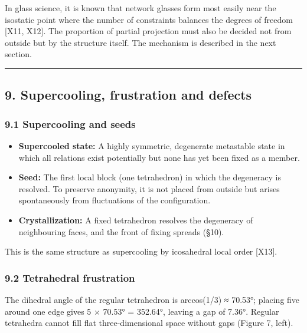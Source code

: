 \documentclass[
  a4paper,
]{article}
\newcounter{none} %
\providecommand{\tightlist}{%
  \setlength{\itemsep}{0pt}\setlength{\parskip}{0pt}}
\begin{document}
In glass science, it is known that network glasses form most easily near
the isostatic point where the number of constraints balances the degrees
of freedom {[}X11, X12{]}. The proportion of partial projection must
also be decided not from outside but by the structure itself. The
mechanism is described in the next section.

\begin{center}\rule{0.5\linewidth}{0.5pt}\end{center}

\subsection{9. Supercooling, frustration and
defects}\label{supercooling-frustration-and-defects}

\subsubsection{9.1 Supercooling and seeds}\label{supercooling-and-seeds}

\begin{itemize}
\tightlist
\item
  \textbf{Supercooled state:} A highly symmetric, degenerate metastable
  state in which all relations exist potentially but none has yet been
  fixed as a member.
\item
  \textbf{Seed:} The first local block (one tetrahedron) in which the
  degeneracy is resolved. To preserve anonymity, it is not placed from
  outside but arises spontaneously from fluctuations of the
  configuration.
\item
  \textbf{Crystallization:} A fixed tetrahedron resolves the degeneracy
  of neighbouring faces, and the front of fixing spreads (§10).
\end{itemize}

This is the same structure as supercooling by icosahedral local order
{[}X13{]}.

\subsubsection{9.2 Tetrahedral
frustration}\label{tetrahedral-frustration}

The dihedral angle of the regular tetrahedron is arccos(1/3) ≈ 70.53°;
placing five around one edge gives 5 × 70.53° = 352.64°, leaving a gap
of 7.36°. Regular tetrahedra cannot fill flat three-dimensional space
without gaps (Figure 7, left).
\end{document}
